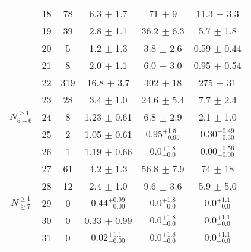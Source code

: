 \begin{table} [h!]
\begin{tabular}{c|c|c|c|c|c}
& 18   &  78  &   6.3 $\pm$ 1.7  &    71 $\pm$ 9   & 11.3 $\pm$ 3.3 \\ 
& 19   &  39  &   2.8 $\pm$ 1.1  &    36.2 $\pm$ 6.3   & 5.7 $\pm$ 1.8 \\ 
& 20   &  5  &   1.2 $\pm$ 1.3  &    3.8 $\pm$ 2.6   & 0.59 $\pm$ 0.44 \\ 
& 21   &  8  &   2.0 $\pm$ 1.1  &    6.0 $\pm$ 3.0   & 0.95 $\pm$ 0.54 \\ 
\hline
\multirow{5}{*}{$N_{5-6}^{\geq1}$}
& 22   &  319  &   16.8 $\pm$ 3.7  &    302 $\pm$ 18   & 275 $\pm$ 31 \\ 
& 23   &  28  &   3.4 $\pm$ 1.0  &    24.6 $\pm$ 5.4   & 7.7 $\pm$ 2.4 \\ 
& 24   &  8  &   1.23 $\pm$ 0.61  &    6.8 $\pm$ 2.9   & 2.1 $\pm$ 1.0 \\ 
& 25   &  2  &   1.05 $\pm$ 0.61  &    $0.95^{+1.5}_{-0.95}$   & $0.30^{+0.49}_{-0.30}$ \\ 
& 26   &  1  &   1.19 $\pm$ 0.66  &    $0.0_{-0.0}^{+1.8}$   & $0.00_{-0.00}^{+0.56}$ \\ 
\hline
\multirow{5}{*}{$N_{\geq7}^{\geq1}$}
& 27   &  61  &   4.2 $\pm$ 1.3  &    56.8 $\pm$ 7.9   & 74 $\pm$ 18 \\ 
& 28   &  12  &   2.4 $\pm$ 1.0  &    9.6 $\pm$ 3.6    & 5.9 $\pm$ 5.0 \\ 
& 29   &  0  &   $0.44_{-0.00}^{+0.99}$  & $0.0_{-0.0}^{+1.8}$    & $0.0^{+1.1}_{-0.0}$ \\ 
& 30   &  0  &   0.33 $\pm$ 0.99  &    $0.0_{-0.0}^{+1.8}$   & $0.0^{+1.1}_{-0.0}$ \\ 
& 31   &  0  &   $0.02_{-0.00}^{+1.1}$  &    $0.0_{-0.0}^{+1.8}$   & $0.0^{+1.1}_{-0.0}$ \\ 
\hline
\end{tabular}
\end{table}

   